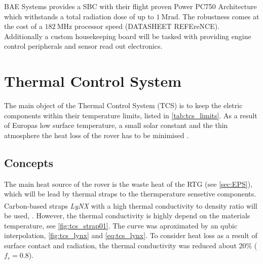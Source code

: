 BAE Systems provides a SBC with their flight proven Power PC750 Architecture which withstands a total radiation dose of up to $1~\text{Mrad}$. The robustness comes at the cost of a $182~\text{MHz}$ processor speed (DATASHEET REFEreNCE). \\

Additionally a custom housekeeping board will be tasked with providing engine control peripherals and sensor read out electronics. 

\section{Thermal Control System} \label{sec:thermalcontrol}
The main object of the Thermal Control System (TCS) is to keep the eletric components within their temperature limits, listed in \autoref{tab:tcs_limits}.
As a result of Europas low surface temperature, a small solar constant and the thin atmosphere the heat loss of the rover has to be minimised  \cite{Europa}.

\subsection{Concepts}
The main heat source of the rover is the waste heat of the RTG (see \autoref{sec:EPS}), which will be lead by thermal straps to the thermperature sensetive components.
Carbon-based straps \textit{LyNX}\textsuperscript{\tiny\textregistered} with a high thermal conductivity to density ratio will be used, \cite{ref_tcs_01}.
However, the thermal conductivity is highly depend on the materials temperature, see \autoref{fig:tcs_strap01}.
The curve was aproximated by an qubic interpolation, \autoref{fig:tcs_lynx} and \autoref{eq:tcs_lynx}.
To consider heat loss as a result of surface contact and radiation, the thermal conductivity was reduced about 20\% ($f_{r}=0.8$).


